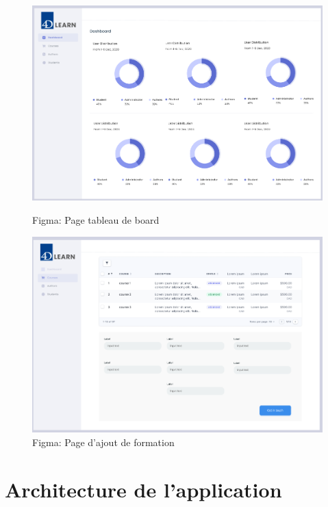 \begin{figure}[H]
    \centering
    \begin{minipage}{0.45\textwidth}
        \centering
        \includegraphics[width=\textwidth]{Figures/figmaDashoboard.PNG}
        \caption{Figma: Page tableau de board}
    \end{minipage}
    \hfill
    \begin{minipage}{0.45\textwidth}
        \centering
        \includegraphics[width=\textwidth]{Figures/addCourseDashboard.png}
        \caption{Figma: Page d'ajout de formation}
    \end{minipage}
    
\end{figure}

\section{Architecture de l’application}

